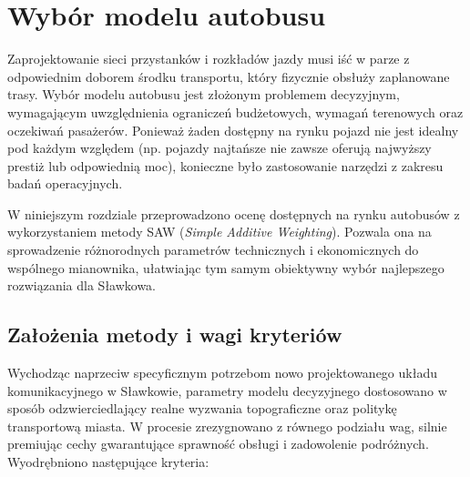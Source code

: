 \chapter{Wybór modelu autobusu}
Zaprojektowanie sieci przystanków i rozkładów jazdy musi iść w parze z odpowiednim doborem środku transportu, który fizycznie obsłuży zaplanowane trasy. Wybór modelu autobusu jest złożonym problemem decyzyjnym, wymagającym uwzględnienia ograniczeń budżetowych, wymagań terenowych oraz oczekiwań pasażerów. Ponieważ żaden dostępny na rynku pojazd nie jest idealny pod każdym względem (np. pojazdy najtańsze nie zawsze oferują najwyższy prestiż lub odpowiednią moc), konieczne było zastosowanie narzędzi z zakresu badań operacyjnych.

W niniejszym rozdziale przeprowadzono ocenę dostępnych na rynku autobusów z wykorzystaniem metody SAW (\textit{Simple Additive Weighting}). Pozwala ona na sprowadzenie różnorodnych parametrów technicznych i ekonomicznych do wspólnego mianownika, ułatwiając tym samym obiektywny wybór najlepszego rozwiązania dla Sławkowa.

\section{Założenia metody i wagi kryteriów}
Wychodząc naprzeciw specyficznym potrzebom nowo projektowanego układu komunikacyjnego w Sławkowie, parametry modelu decyzyjnego dostosowano w sposób odzwierciedlający realne wyzwania topograficzne oraz politykę transportową miasta. W procesie zrezygnowano z równego podziału wag, silnie premiując cechy gwarantujące sprawność obsługi i zadowolenie podróżnych. Wyodrębniono następujące kryteria:

